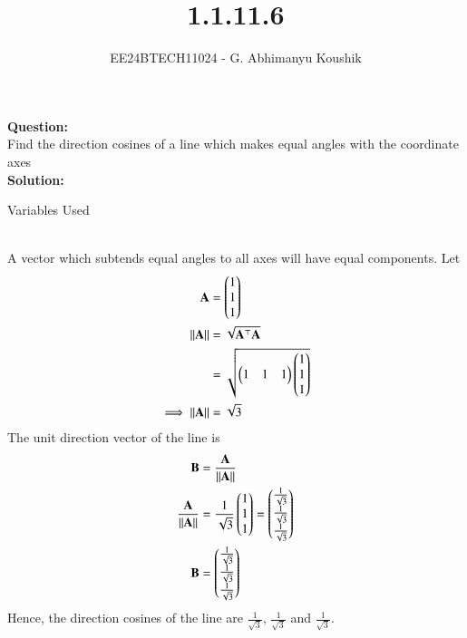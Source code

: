 \documentclass[journal]{IEEEtran}
\begin{document}

\vspace{3cm}

\title{1.1.11.6}
\author{EE24BTECH11024 - G. Abhimanyu Koushik
}
{\let\newpage\relax\maketitle}

\renewcommand{\thefigure}{\theenumi}
\renewcommand{\thetable}{\theenumi}
\setlength{\intextsep}{10pt} %

\textbf{Question:}\\
Find the direction cosines of a line which makes equal angles with the coordinate axes
\\
\textbf{Solution:}
\begin{table}[h!]    
  \centering
  
  \caption{Variables Used}
  \label{tab10.5.3.9.1}
\end{table}\\
A vector which subtends equal angles to all axes will have equal components. Let 
\begin{align}
	\mathbf{A} &= \begin{pmatrix}1\\1\\1\end{pmatrix}\\
	\left\lVert\mathbf{A}\right\rVert &= \sqrt{\mathbf{A}^\top\mathbf{A}}\\
		     &= \sqrt{\begin{pmatrix}1 & 1 & 1\end{pmatrix}\begin{pmatrix}1\\1\\1\end{pmatrix}}\\
	\implies \left\lVert\mathbf{A}\right\rVert &= \sqrt{3}
\end{align}
The unit direction vector of the line is
\begin{align}
	\mathbf{B} &= \frac{\mathbf{A}}{\left\lVert\mathbf{A}\right\rVert}\\
	\frac{\mathbf{A}}{\left\lVert\mathbf{A}\right\rVert} &= \frac{1}{\sqrt{3}}\begin{pmatrix}1\\1\\1\end{pmatrix} = \begin{pmatrix}\frac{1}{\sqrt{3}}\\\frac{1}{\sqrt{3}}\\\frac{1}{\sqrt{3}}\end{pmatrix}\\
	\mathbf{B} &= \begin{pmatrix}\frac{1}{\sqrt{3}}\\\frac{1}{\sqrt{3}}\\\frac{1}{\sqrt{3}}\end{pmatrix}
\end{align}
Hence, the direction cosines of the line are $\frac{1}{\sqrt{3}}$, $\frac{1}{\sqrt{3}}$ and $\frac{1}{\sqrt{3}}$.
\end{document}

